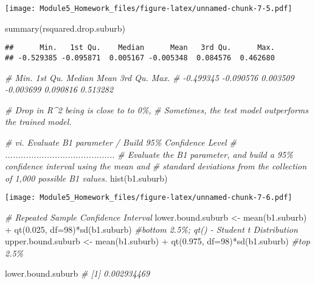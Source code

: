 \documentclass[
]{article}
\newenvironment{Shaded}{\begin{snugshade}}{\end{snugshade}}
\newcommand{\AttributeTok}[1]{\textcolor[rgb]{0.77,0.63,0.00}{#1}}
\newcommand{\CommentTok}[1]{\textcolor[rgb]{0.56,0.35,0.01}{\textit{#1}}}
\newcommand{\DecValTok}[1]{\textcolor[rgb]{0.00,0.00,0.81}{#1}}
\newcommand{\FloatTok}[1]{\textcolor[rgb]{0.00,0.00,0.81}{#1}}
\newcommand{\FunctionTok}[1]{\textcolor[rgb]{0.00,0.00,0.00}{#1}}
\newcommand{\NormalTok}[1]{#1}
\newcommand{\OtherTok}[1]{\textcolor[rgb]{0.56,0.35,0.01}{#1}}
\newcommand{\SpecialCharTok}[1]{\textcolor[rgb]{0.00,0.00,0.00}{#1}}
\begin{document}
\texttt{[image: Module5\_Homework\_files/figure-latex/unnamed-chunk-7-5.pdf]}

\begin{Shaded}
\begin{Highlighting}[]
\FunctionTok{summary}\NormalTok{(rsquared.drop.suburb)}
\end{Highlighting}
\end{Shaded}

\begin{verbatim}
##      Min.   1st Qu.    Median      Mean   3rd Qu.      Max. 
## -0.529385 -0.095871  0.005167 -0.005348  0.084576  0.462680
\end{verbatim}

\begin{Shaded}
\begin{Highlighting}[]
    \CommentTok{\#     Min.   1st Qu.    Median      Mean   3rd Qu.      Max. }
    \CommentTok{\# {-}0.499345 {-}0.090576  0.003509 {-}0.003699  0.090816  0.513282 }

    \CommentTok{\# Drop in R\^{}2 being is close to to 0\%,}
    \CommentTok{\# Sometimes, the test model outperforms the trained model.  }



\CommentTok{\# vi. Evaluate B1 parameter / Build 95\% Confidence Level}
\CommentTok{\# ..........................................}
\CommentTok{\# Evaluate the B1 parameter, and build a 95\% confidence interval using the mean and }
\CommentTok{\# standard deviations from the collection of 1,000 possible B1 values.}
\FunctionTok{hist}\NormalTok{(b1.suburb)}
\end{Highlighting}
\end{Shaded}

\texttt{[image: Module5\_Homework\_files/figure-latex/unnamed-chunk-7-6.pdf]}

\begin{Shaded}
\begin{Highlighting}[]
\CommentTok{\# Repeated Sample Confidence Interval}
\NormalTok{lower.bound.suburb }\OtherTok{\textless{}{-}} \FunctionTok{mean}\NormalTok{(b1.suburb) }\SpecialCharTok{+} \FunctionTok{qt}\NormalTok{(}\FloatTok{0.025}\NormalTok{, }\AttributeTok{df=}\DecValTok{98}\NormalTok{)}\SpecialCharTok{*}\FunctionTok{sd}\NormalTok{(b1.suburb)   }\CommentTok{\#bottom 2.5\%; qt() {-} Student t Distribution}
\NormalTok{upper.bound.suburb }\OtherTok{\textless{}{-}} \FunctionTok{mean}\NormalTok{(b1.suburb) }\SpecialCharTok{+} \FunctionTok{qt}\NormalTok{(}\FloatTok{0.975}\NormalTok{, }\AttributeTok{df=}\DecValTok{98}\NormalTok{)}\SpecialCharTok{*}\FunctionTok{sd}\NormalTok{(b1.suburb)   }\CommentTok{\#top 2.5\%}

\NormalTok{lower.bound.suburb     }\CommentTok{\# [1] 0.002934469}
\end{Highlighting}
\end{Shaded}
\end{document}

